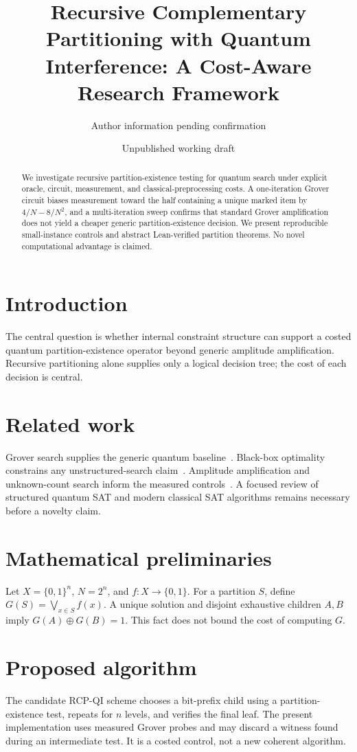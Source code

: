 \documentclass[11pt]{article}
\title{Recursive Complementary Partitioning with Quantum Interference: A Cost-Aware Research Framework}
\author{Author information pending confirmation}
\date{Unpublished working draft}
\begin{document}
\maketitle

\begin{abstract}
We investigate recursive partition-existence testing for quantum search under explicit oracle, circuit, measurement, and classical-preprocessing costs. A one-iteration Grover circuit biases measurement toward the half containing a unique marked item by $4/N-8/N^2$, and a multi-iteration sweep confirms that standard Grover amplification does not yield a cheaper generic partition-existence decision. We present reproducible small-instance controls and abstract Lean-verified partition theorems. No novel computational advantage is claimed.
\end{abstract}

\section{Introduction}
The central question is whether internal constraint structure can support a costed quantum partition-existence operator beyond generic amplitude amplification. Recursive partitioning alone supplies only a logical decision tree; the cost of each decision is central.

\section{Related work}
Grover search supplies the generic quantum baseline~\cite{grover1996}. Black-box optimality constrains any unstructured-search claim~\cite{bbbv1997,zalka1999}. Amplitude amplification and unknown-count search inform the measured controls~\cite{bhmt2002,bbht1998}. A focused review of structured quantum SAT and modern classical SAT algorithms remains necessary before a novelty claim.

\section{Mathematical preliminaries}
Let $X=\{0,1\}^n$, $N=2^n$, and $f:X\to\{0,1\}$. For a partition $S$, define $G(S)=\bigvee_{x\in S}f(x)$. A unique solution and disjoint exhaustive children $A,B$ imply $G(A)\oplus G(B)=1$. This fact does not bound the cost of computing $G$.

\section{Proposed algorithm}
The candidate RCP-QI scheme chooses a bit-prefix child using a partition-existence test, repeats for $n$ levels, and verifies the final leaf. The present implementation uses measured Grover probes and may discard a witness found during an intermediate test. It is a costed control, not a new coherent algorithm.
\end{document}

